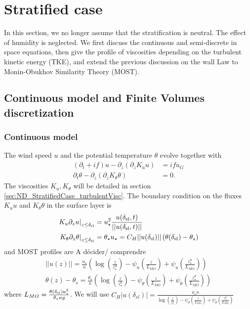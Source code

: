 \section{Stratified case}
In this section, we no longer assume that the stratification
is neutral. The effect of humidity is neglected.
We first discuss the continuous and semi-discrete in space
equations, then give the
profile of viscosities depending on the turbulent kinetic energy
(TKE), and extend the previous discussion on the wall Law to
Monin-Obukhov Similarity Theory (MOST).

\subsection{Continuous model and Finite Volumes discretization}
\subsubsection{Continuous model}
The wind speed $u$ and the potential temperature $\theta$ evolve
together with
\begin{equation}
\begin{aligned}
	\label{eq:ND_StratifiedCase_EkmanEq}
  (\partial_t + if) u - \partial_z (\partial_z K_u u) &= if u_G \\
  \partial_t \theta -\partial_z (\partial_z K_{\theta} \theta) &= 0.
\end{aligned}
\end{equation}
The viscosities $K_u, K_\theta$ will be detailed in section \ref{sec:ND_StratifiedCase_turbulentVisc}.
The boundary condition on the fluxes $K_u u$ and $K_\theta \theta$
in the surface layer is
\begin{equation}
\begin{aligned}
	\left.K_u \partial_z u \right|_{z\leq \delta_{\rm sl}}
	&= u_\star^2
	\frac{u(\delta_{\rm sl}, t)}{||u(\delta_{\rm sl}, t)||} \\
	\left.K_\theta \partial_z \theta
	\right|_{z\leq \delta_{\rm sl}}
	&= \theta_\star u_\star = C_H ||u(\delta_{\rm sl})||
	\left(\theta(\delta_{\rm sl}) - \theta_{s}\right)
\end{aligned}
\end{equation}
and MOST profiles are {\color{red} A décider/ comprendre}
\begin{equation}
\label{eq:ND_StratifiedCase_MOST}
\begin{aligned}
    ||u(z)|| = \frac{u_\star}{\kappa}
    \left(
    \log(\frac{z}{z_\star^u})
    - \psi_u(\frac{z}{L_{MO}})
    + \psi_u(\frac{z_\star^u}{L_{MO}})
    \right)
    \\
    \theta(z) - \theta_s = 
    \frac{\theta_\star}{\kappa}
    \left(
    \log(\frac{z}{z_\star^\theta})
    - \psi_\theta(\frac{z}{L_{MO}})
    + \psi_\theta(\frac{z_\star^\theta}{{L_{MO}}})
    \right)
\end{aligned}
\end{equation}
where $L_{MO} = \frac{\theta(\delta_{\rm sl})
u_\star^2}{\theta_\star \kappa g }$. We will use
$C_H|u(\delta_{sl})| = \frac{u_\star \kappa}{\log(\frac{z}{z_\star^\theta})
    - \psi_\theta(\frac{z}{L_{MO}})
    + \psi_\theta(\frac{z_\star^\theta}{{L_{MO}}})}$
